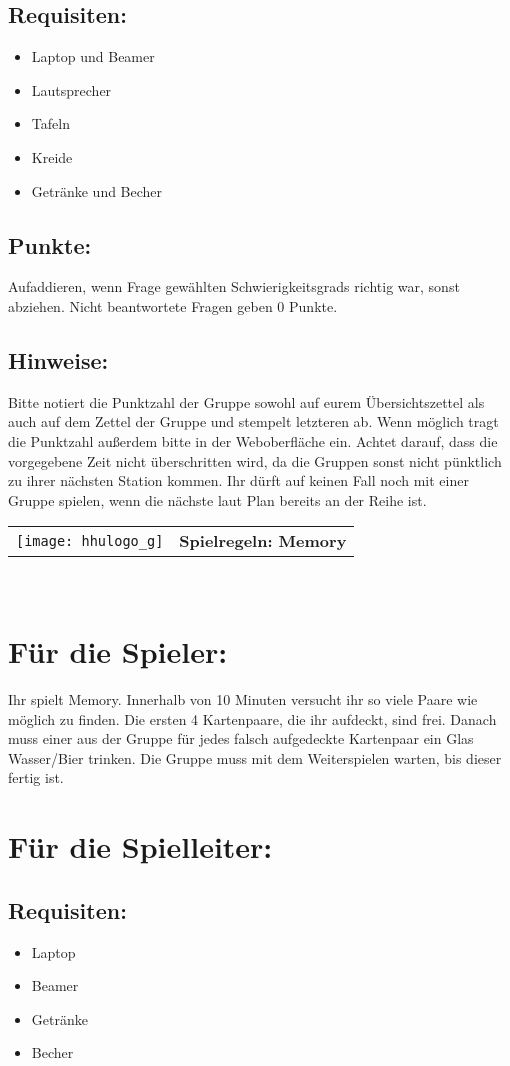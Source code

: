\documentclass[a4paper,10pt]{article}
\def\spielg{Memory}
\newcommand{\unten}{
 Bitte notiert die Punktzahl der Gruppe sowohl auf eurem Übersichtszettel als auch auf dem Zettel der Gruppe und stempelt letzteren ab. Wenn möglich tragt die Punktzahl außerdem bitte in der Weboberfläche ein.
 Achtet darauf, dass die vorgegebene Zeit nicht überschritten wird, da die Gruppen sonst nicht pünktlich zu ihrer nächsten Station kommen. Ihr dürft auf keinen Fall noch mit einer Gruppe spielen, wenn die nächste laut Plan bereits an der Reihe ist.
}
\begin{document}
\subsection*{Requisiten:} 
\begin{itemize}
 \item Laptop und Beamer
 \item Lautsprecher
 \item Tafeln
 \item Kreide
 \item Getränke und Becher
\end{itemize}

\subsection*{Punkte:}
Aufaddieren, wenn Frage gewählten Schwierigkeitsgrads richtig war, sonst abziehen. Nicht beantwortete Fragen geben 0 Punkte.
\subsection*{Hinweise:}
\unten

\newpage


  \begin{tabularx}{\textwidth}{lc}
    \texttt{[image: hhulogo\_g]}
  & {\Huge \textbf{Spielregeln: \spielg}}
  \end{tabularx}\\

\Large
\section*{Für die Spieler:}
Ihr spielt Memory. Innerhalb von 10 Minuten versucht ihr so viele Paare wie möglich zu finden. Die ersten 4 Kartenpaare, die ihr aufdeckt, sind frei. Danach muss einer aus der Gruppe für jedes falsch aufgedeckte Kartenpaar ein Glas Wasser/Bier trinken. Die Gruppe muss mit dem Weiterspielen warten, bis dieser fertig ist.

\section*{Für die Spielleiter:}
\subsection*{Requisiten:} 
\begin{itemize}
 \item Laptop
 \item Beamer
 \item Getränke
 \item Becher
\end{itemize}
\end{document}
